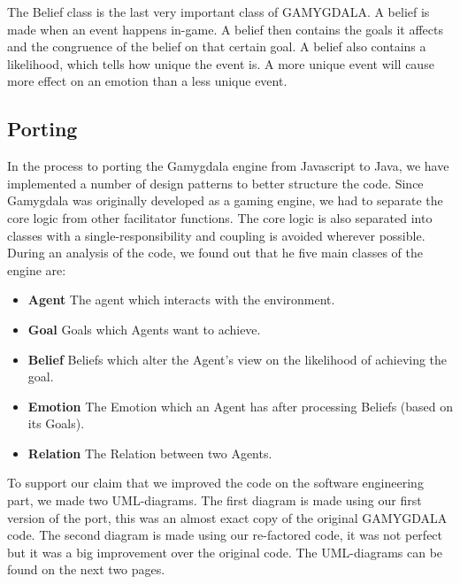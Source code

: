 The Belief class is the last very important class of GAMYGDALA. A belief is made when an event happens in-game. A belief then contains the goals it affects and the congruence of the belief on that certain goal. A belief also contains a likelihood, which tells how unique the event is. A more unique event will cause more effect on an emotion than a less unique event.

\subsection{Porting}
In the process to porting the Gamygdala engine from Javascript to Java, we have implemented a number of design patterns to better structure the code. Since Gamygdala was originally developed as a gaming engine, we had to separate the core logic from other facilitator functions. The core logic is also separated into classes with a single-responsibility and coupling is avoided wherever possible. \\

During an analysis of the code, we found out that he five main classes of the engine are:
\begin{itemize}
	\item \textbf{Agent} The agent which interacts with the environment.
	\item \textbf{Goal} Goals which Agents want to achieve.
	\item \textbf{Belief} Beliefs which alter the Agent's view on the likelihood of achieving the goal.
	\item \textbf{Emotion} The Emotion which an Agent has after processing Beliefs (based on its Goals).
	\item \textbf{Relation} The Relation between two Agents.
\end{itemize}

To support our claim that we improved the code on the software engineering part, we made two UML-diagrams. The first diagram is made using our first version of the port, this was an almost exact copy of the original GAMYGDALA code. The second diagram is made using our re-factored code, it was not perfect but it was a big improvement over the original code. The UML-diagrams can be found on the next two pages.\\

